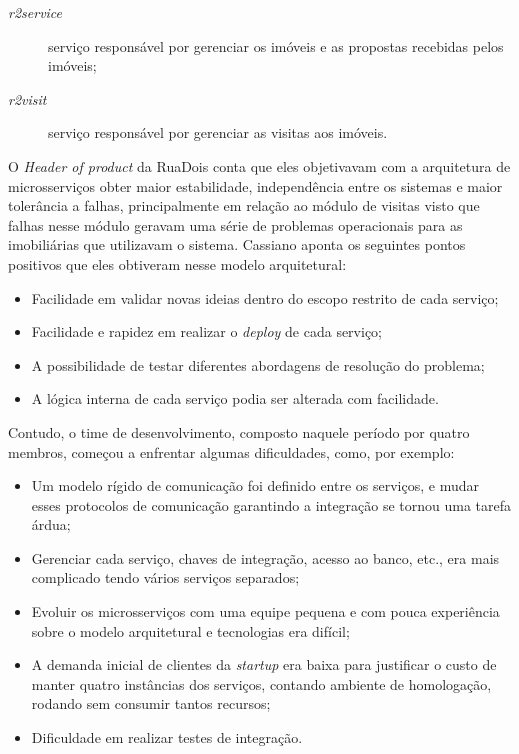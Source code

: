 \begin{description}
    \item [\textit{r2service}] serviço responsável por gerenciar os imóveis e as propostas recebidas
        pelos imóveis;
    \item [\textit{r2visit}] serviço responsável por gerenciar as visitas aos imóveis.
\end{description}

O \textit{Header of product} da RuaDois conta que eles objetivavam com a arquitetura de
microsserviços obter maior estabilidade, independência entre os sistemas e maior tolerância a falhas,
principalmente em relação ao módulo de visitas visto que falhas nesse módulo geravam uma série de
problemas operacionais para as imobiliárias que utilizavam o sistema. Cassiano aponta os seguintes
pontos positivos que eles obtiveram nesse modelo arquitetural:

\begin{itemize}
    \item Facilidade em validar novas ideias dentro do escopo restrito de cada serviço;
    \item Facilidade e rapidez em realizar o \textit{deploy} de cada serviço;
    \item A possibilidade de testar diferentes abordagens de resolução do problema;
    \item A lógica interna de cada serviço podia ser alterada com facilidade.
\end{itemize}

Contudo, o time de desenvolvimento, composto naquele período por quatro membros, começou a enfrentar
algumas dificuldades, como, por exemplo:

\begin{itemize}
    \item Um modelo rígido de comunicação foi definido entre os serviços, e mudar esses protocolos
        de comunicação garantindo a integração se tornou uma tarefa árdua; 
    \item Gerenciar cada serviço, chaves de integração, acesso ao banco, etc., era mais complicado
        tendo vários serviços separados;
    \item Evoluir os microsserviços com uma equipe pequena e com pouca experiência sobre o modelo
        arquitetural e tecnologias era difícil;
    \item A demanda inicial de clientes da \textit{startup} era baixa para justificar o custo de
        manter quatro instâncias dos serviços, contando ambiente de homologação, rodando sem
        consumir tantos recursos;
    \item Dificuldade em realizar testes de integração.
\end{itemize}

